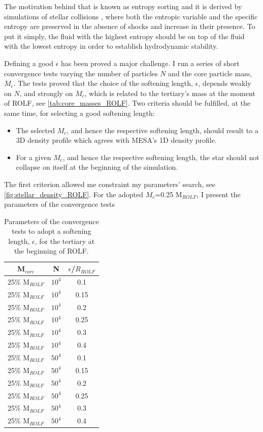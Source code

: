 The motivation behind that is known as entropy sorting and it is derived by simulations of stellar collisions \citep{lombardi1995collisions,lombardi2003modelling,lombardi2006stellar,gaburov2008mixing,gaburov2010onset}, where both the entropic variable and the specific entropy are preserved in the absence of shocks and increase in their presence. To put it simply, the fluid with the highest entropy should be on top of the fluid with the lowest entropy in order to establish hydrodynamic stability. 

Defining a good $\epsilon$ has been proved a major challenge. I run a series of short convergence tests varying the number of particles $N$ and the core particle mass, $M_c$. The tests proved that the choice of the softening length, $\epsilon$, depends weakly on $N$, and strongly on $M_c$, which is related to the tertiary's mass at the moment of ROLF, see \cref{tab:core_masses_ROLF}. Two criteria should be fulfilled, at the same time, for selecting a good softening length:
\begin{itemize}
    \item The selected $M_c$, and hence the respective softening length, should result to a 3D density profile which agrees with MESA's 1D density profile.
    \item For a given $M_c$, and hence the respective softening length, the star should not collapse on itself at the beginning of the simulation.
\end{itemize}
The first criterion allowed me constraint my parameters' search, see \cref{fig:stellar_density_ROLF}. For the adopted $M_c$=0.25 M$_{ROLF}$, I present the parameters of the convergence tests
\begin{table}[H]
    \centering
    \begin{tabular}{| c | c | c |}
       M$_{core}$  & N & $\epsilon$/$R_{ROLF}$ \\
       \hline
       25\% M$_{ROLF}$ & $10^4$ & 0.1\\
       25\% M$_{ROLF}$ & $10^4$ & 0.15\\
       25\% M$_{ROLF}$ & $10^4$ & 0.2\\
       25\% M$_{ROLF}$ & $10^4$ & 0.25\\
       25\% M$_{ROLF}$ & $10^4$ & 0.3\\
       25\% M$_{ROLF}$ & $10^4$ & 0.4\\
       \hline
       25\% M$_{ROLF}$ & $50^4$ & 0.1\\
       25\% M$_{ROLF}$ & $50^4$ & 0.15\\
       25\% M$_{ROLF}$ & $50^4$ & 0.2\\
       25\% M$_{ROLF}$ & $50^4$ & 0.25\\
       25\% M$_{ROLF}$ & $50^4$ & 0.3\\
       25\% M$_{ROLF}$ & $50^4$ & 0.4\\
    \end{tabular}
    \caption{ Parameters of the convergence tests to adopt a softening length, $\epsilon$, for the tertiary at the beginning of ROLF.}
\label{tab:smoothing_length_exploration}
\end{table}
